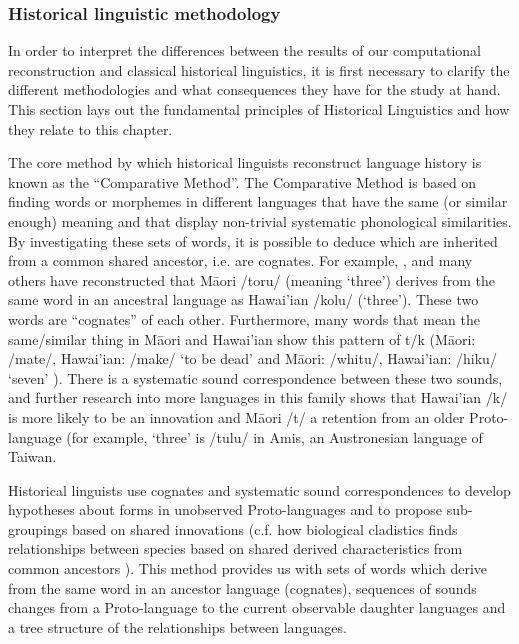 \documentclass[draft,10pt]{article} %
\begin{document}
\subsubsection{Historical linguistic methodology}
\label{sec:ars:metod:hist}
In order to interpret the differences between the results of our computational reconstruction and classical historical linguistics, it is first necessary to clarify the different methodologies and what consequences they have for the study at hand. This section lays out the fundamental principles of Historical Linguistics and how they relate to this chapter.

The core method by which historical linguists reconstruct language history is known as the ``Comparative Method''. The Comparative Method is based on finding words or morphemes in different languages that have the same (or similar enough) meaning and that display non-trivial systematic phonological similarities. By investigating these sets of words, it is possible to deduce which are inherited from a common shared ancestor, i.e. are cognates. For example, \citet{blust2004}, \citet{greenhill2011pollex} and many others have reconstructed that M\={a}ori /toru/ (meaning `three') derives from the same word in an ancestral language as Hawai'ian /kolu/ (`three'). These two words are ``cognates'' of each other. Furthermore, many words that mean the same/similar thing in M\={a}ori and Hawai'ian show this pattern of t/k (M\={a}ori: /mate/, Hawai'ian: /make/ `to be dead'  and M\={a}ori: /whitu/, Hawai'ian: /hiku/ `seven'  \citep{ABVD}). There is a systematic sound correspondence between these two sounds, and further research into more languages in this family shows that Hawai'ian /k/ is more likely to be an innovation and M\={a}ori /t/ a retention from an older Proto-language (for example, `three' is /tulu/ in Amis, an Austronesian language of Taiwan.


Historical linguists use cognates and systematic sound correspondences to develop hypotheses about forms in unobserved Proto-languages and to propose sub-groupings based on shared innovations (c.f. how biological cladistics finds relationships between species based on shared derived characteristics from common ancestors \citep[16-17]{maclaurin2008biodiversity}). This method provides us with sets of words which derive from the same word in an ancestor language (cognates), sequences of sounds changes from a Proto-language to the current observable daughter languages and a tree structure of the relationships between languages. 
 
\end{document}

